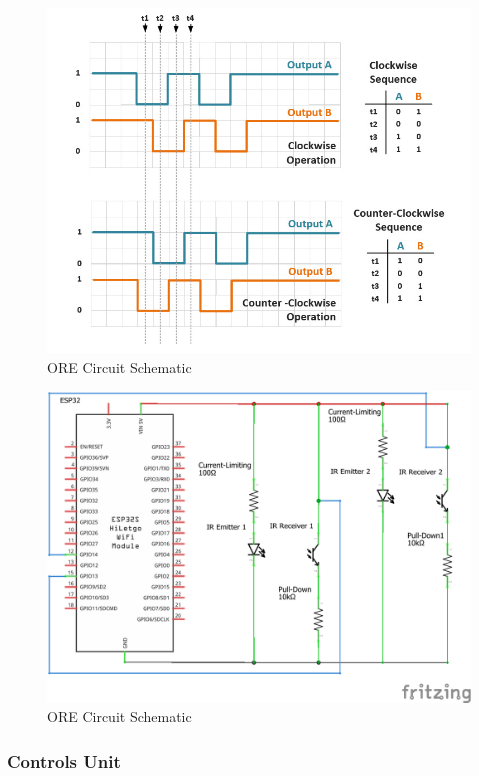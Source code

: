 \begin{figure}[H]
  \centering
  \includegraphics[width=.8\textwidth]{Controls/ORE_signal.jpg}
  \caption{\label{fig:ORE_signal}ORE Circuit Schematic}
\end{figure}

\begin{figure}[H]
  \centering
  \includegraphics[width=.8\textwidth]{Controls/ORE_circuit_schem.png}
  \caption{\label{fig:ORE_circuit_schem}ORE Circuit Schematic}
\end{figure}



\subsubsection{Controls Unit}

